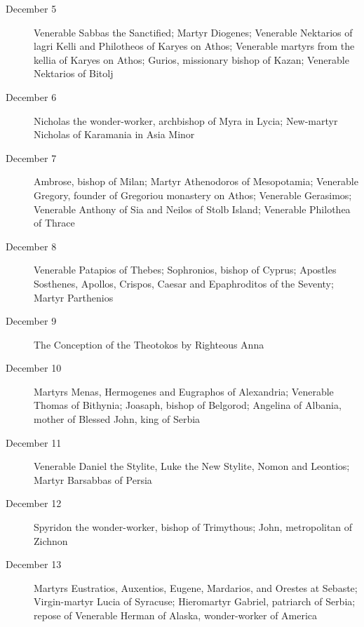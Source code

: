\begin{description}
\item[December 5]

Venerable Sabbas the Sanctified; Martyr Diogenes; Venerable Nektarios of lagri Kelli and Philotheos of Karyes on Athos; Venerable martyrs from the kellia of Karyes on Athos; Gurios, missionary bishop of Kazan; Venerable Nektarios of Bitolj

\item[December 6]

Nicholas the wonder-worker, archbishop of Myra in Lycia; New-martyr Nicholas of Karamania in Asia Minor

\item[December 7]

Ambrose, bishop of Milan; Martyr Athenodoros of Mesopotamia; Venerable Gregory, founder of Gregoriou monastery on Athos; Venerable Gerasimos; Venerable Anthony of Sia and Neilos of Stolb Island; Venerable Philothea of Thrace

\item[December 8]

Venerable Patapios of Thebes; Sophronios, bishop of Cyprus; Apostles Sosthenes, Apollos, Crispos, Caesar and Epaphroditos of the Seventy; Martyr Parthenios

\item[December 9]

The Conception of the Theotokos by Righteous Anna

\item[December 10]

Martyrs Menas, Hermogenes and Eugraphos of Alexandria; Venerable Thomas of Bithynia; Joasaph, bishop of Belgorod; Angelina of Albania, mother of Blessed John, king of Serbia

\item[December 11]

Venerable Daniel the Stylite, Luke the New Stylite, Nomon and Leontios; Martyr Barsabbas of Persia

\item[December 12]

Spyridon the wonder-worker, bishop of Trimythous; John, metropolitan of Zichnon

\item[December 13]

Martyrs Eustratios, Auxentios, Eugene, Mardarios, and Orestes at Sebaste; Virgin-martyr Lucia of Syracuse; Hieromartyr Gabriel, patriarch of Serbia; repose of Venerable Herman of Alaska, wonder-worker of America


\end{description}
